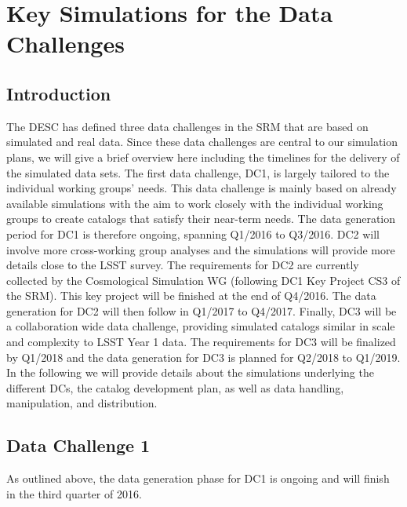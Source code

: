 \section{Key Simulations for the Data Challenges}
\resetnumbering
\label{sec:keysims}



\subsection{Introduction}
\label{sec:keysims:introduction}

The DESC has defined three data challenges in the SRM that are based on simulated and real data. Since these data challenges are central to our simulation plans, we will give a brief overview here including the timelines for the delivery of the simulated data sets. The first data challenge, DC1, is largely tailored to the individual working groups' needs. This data challenge is mainly based on already available simulations with the aim to work closely with the individual working groups to create catalogs that satisfy their near-term needs. The data generation period for DC1 is therefore ongoing, spanning Q1/2016 to Q3/2016. DC2 will involve more cross-working group analyses and the simulations will provide more details close to the LSST survey. The requirements for DC2 are currently collected by the Cosmological Simulation WG (following DC1 Key Project CS3 of the SRM). This key project will be finished at the end of Q4/2016. The data generation for DC2 will then follow in Q1/2017 to Q4/2017. Finally, DC3 will be a collaboration wide data challenge, providing simulated catalogs similar in scale and complexity to LSST Year 1 data. The requirements for DC3 will be finalized by Q1/2018 and the data generation for DC3 is planned for Q2/2018 to Q1/2019. In the following we will provide details about the simulations underlying the different DCs, the catalog development plan, as well as data handling, manipulation, and distribution.

\subsection{Data Challenge 1}
\label{sec:keysims:dc1}

As outlined above, the data generation phase for DC1 is ongoing and will finish in the third quarter of 2016. 

